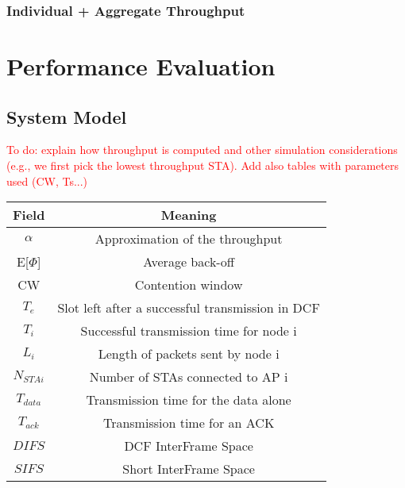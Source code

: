 \documentclass{article}
\begin{document}
		\subsubsection{Individual + Aggregate Throughput}
		\label{section:mix}

\section{Performance Evaluation}
\label{section:performance_evaluation}

	\subsection{System Model}
	\label{section:system_model}
		\textcolor{red}{To do: explain how throughput is computed and other simulation considerations (e.g., we first pick the lowest throughput STA). Add also tables with parameters used (CW, Ts...)}	
	\begin{center}\renewcommand*{\arraystretch}{1.25}
\setlength\tabcolsep{15pt}

\begin{tabular}{|c|c|}


  \hline
  
   \textbf{Field} & \textbf{Meaning}\\ \hline
 $\alpha$  & Approximation of the throughput \\\hline
  E[$\Phi$] & Average back-off\\\hline
  CW & Contention window \\\hline
  $T_e$ & Slot left after a successful transmission in DCF \\\hline
  $T_i$ & Successful transmission time for node i\\\hline
  $L_i$ & Length of packets sent by node i\\\hline
  $N_{STAi}$ & Number of STAs connected to AP i\\\hline
  $T_{data}$ & Transmission time for the data alone\\\hline
  $T_{ack}$ & Transmission time for an ACK\\\hline
  $DIFS$ & DCF InterFrame Space \\\hline
  $SIFS$ & Short InterFrame Space \\\hline


\end{tabular}

\end{center}
\end{document}
